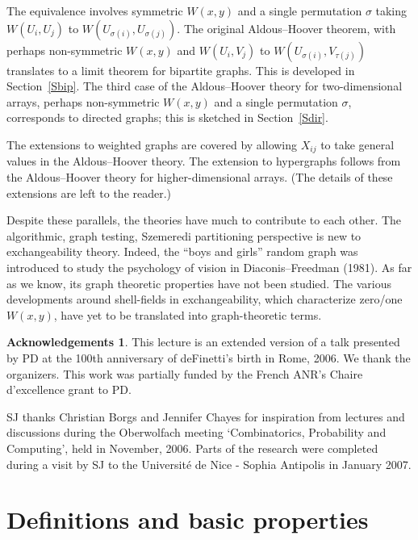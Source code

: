 \documentclass[11pt,reqno,tbtags]{amsart}
\numberwithin{equation}{section}
\theoremstyle{definition}
\newtheorem*{acks}{Acknowledgements}
\theoremstyle{remark}
\newcommand{\refS}[1]{Section~\ref{#1}}
\newcommand\gs{\sigma}
\renewcommand{\=}{:=}
\begin{document}
The equivalence involves symmetric $W(x,y)$ and a single permutation
$\sigma$ taking $W(U_i, U_j)$ to $W(U_{\sigma(i)},
U_{\sigma(j)})$. The original Aldous--Hoover theorem, with perhaps
non-symmetric $W(x,y)$ and $W(U_i, V_j)$ to
$W(U_{\sigma(i)},V_{\tau(j)})$ 
translates to a limit theorem for bipartite
graphs. This is developed in \refS{Sbip}. 
The third case of the Aldous--Hoover theory for 
two-dimensional arrays, perhaps 
non-symmetric $W(x,y)$ and a single permutation $\gs$,
corresponds to directed graphs; this is sketched in \refS{Sdir}. 

The extensions to weighted
graphs are covered by allowing $X_{ij}$ to take general values in the
Aldous--Hoover theory. The extension to hypergraphs follows from the
Aldous--Hoover theory for higher-dimensional arrays.
(The details of these extensions are left to the reader.) 

Despite these parallels, the theories have much to contribute to each
other. The algorithmic, graph testing, Szemeredi partitioning
perspective is new to exchangeability theory. Indeed, the ``boys and
girls'' random graph was introduced to study the psychology of vision
in Diaconis--Freedman (1981). As far as we know, its graph theoretic
properties have not been studied. The various developments around
shell-fields in exchangeability, which characterize zero/one $W(x,y)$,
have yet to be translated into graph-theoretic terms.

\begin{acks}
This lecture is an extended version of a talk presented by PD at the 100th
anniversary of deFinetti's birth in Rome, 2006. We thank the
organizers. This work was partially funded by the French ANR's Chaire
d'excellence grant to PD.

SJ thanks 
Christian Borgs and Jennifer Chayes 
for inspiration from
lectures and discussions 
during the Oberwolfach meeting
`Combinatorics, Probability and Computing', held in November, 2006.
Parts of the research were completed during a visit by SJ
to the Universit\'e de Nice - Sophia Antipolis in January 2007.
\end{acks}

\section{Definitions and basic properties}\label{Sdef}
\end{document}
